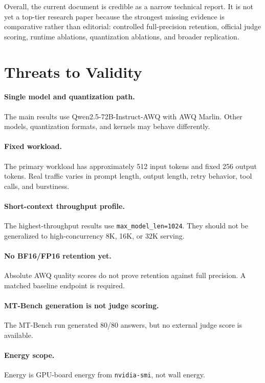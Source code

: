 \documentclass[11pt]{article}
\newcommand{\qwenawq}{Qwen2.5\nobreakdash-72B\nobreakdash-Instruct\nobreakdash-AWQ}
\begin{document}
Overall, the current document is credible as a narrow technical report. It is
not yet a top-tier research paper because the strongest missing evidence is
comparative rather than editorial: controlled full-precision retention, official
judge scoring, runtime ablations, quantization ablations, and broader
replication.

\section{Threats to Validity}

\paragraph{Single model and quantization path.}
The main results use \qwenawq{} with AWQ Marlin. Other models,
quantization formats, and kernels may behave differently.

\paragraph{Fixed workload.}
The primary workload has approximately 512 input tokens and fixed 256 output
tokens. Real traffic varies in prompt length, output length, retry behavior,
tool calls, and burstiness.

\paragraph{Short-context throughput profile.}
The highest-throughput results use \texttt{max\_model\_len=1024}. They should
not be generalized to high-concurrency 8K, 16K, or 32K serving.

\paragraph{No BF16/FP16 retention yet.}
Absolute AWQ quality scores do not prove retention against full precision. A
matched baseline endpoint is required.

\paragraph{MT-Bench generation is not judge scoring.}
The MT-Bench run generated 80/80 answers, but no external judge score is
available.

\paragraph{Energy scope.}
Energy is GPU-board energy from \texttt{nvidia-smi}, not wall energy.
\end{document}
